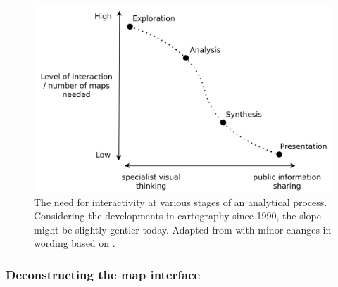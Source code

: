 \begin{figure}[H]
	\centering
	\includegraphics[width=\diagramwidth]{visual/figures/diagrams/swoopy.png}
	\caption{
		The need for interactivity at various stages of an analytical process.
		Considering the developments in cartography since 1990,
		the slope might be slightly gentler today.
		Adapted from \textcite{dib1990} with minor changes in wording based on
		\textcite{rot2015, mac1997}.
	}
	\label{fig:analytical process interaction}
\end{figure}


\subsubsection{Deconstructing the map interface}

